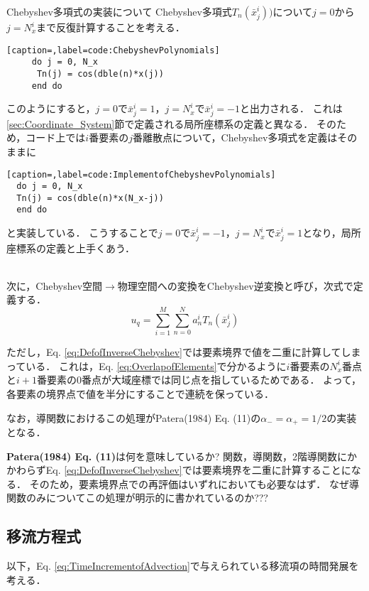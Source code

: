 \documentclass[12pt,a4paper]{jsarticle}
\begin{document}
\begin{itembox}[l]{Chebyshev多項式の実装について}
  Chebyshev多項式$T_{n}(\bar{x}_{j}^i))$について$j=0$から$j=N_{x}^i$まで反復計算することを考える．
  \begin{lstlisting}[caption=,label=code:ChebyshevPolynomials]
     do j = 0, N_x
      Tn(j) = cos(dble(n)*x(j))
     end do
  \end{lstlisting}
  このようにすると，$j=0$で$\bar{x}_{j}^i=1$，$j=N_{x}^i$で$\bar{x}_{j}^i=-1$と出力される．
  これは\ref{sec:Coordinate_System}節で定義される局所座標系の定義と異なる．
  そのため，コード上では$i$番要素の$j$番離散点について，Chebyshev多項式を定義はそのままに
  \begin{lstlisting}[caption=,label=code:ImplementofChebyshevPolynomials]
  do j = 0, N_x
  Tn(j) = cos(dble(n)*x(N_x-j))
  end do
  \end{lstlisting}
  と実装している．
  こうすることで$j=0$で$\bar{x}_{j}^i=-1$，$j=N_{x}^i$で$\bar{x}_{j}^i=1$となり，局所座標系の定義と上手くあう．
\end{itembox}\\

次に，Chebyshev空間$\rightarrow$物理空間への変換をChebyshev逆変換と呼び，次式で定義する．
\begin{equation}
  u_{q} = \sum_{i=1}^{M} \sum_{n=0}^N a_{n}^{i} T_{n}(\bar{x}_{j}^i)
\label{eq:DefofInverseChebyshev}
\end{equation}

ただし，Eq. \ref{eq:DefofInverseChebyshev}では要素境界で値を二重に計算してしまっている．
これは，Eq. \ref{eq:OverlapofElements}で分かるように$i$番要素の$N_{x}^i$番点と$i+1$番要素の$0$番点が大域座標では同じ点を指しているためである．
よって，各要素の境界点で値を半分にすることで連続を保っている．

なお，導関数におけるこの処理がPatera(1984) Eq. (11)の$\alpha_{-}=\alpha_{+}=1/2$の実装となる．\\

\begin{itembox}[l]{\textbf{Patera(1984) Eq. (11)}は何を意味しているか?}
  関数，導関数，2階導関数にかかわらずEq. \ref{eq:DefofInverseChebyshev}では要素境界を二重に計算することになる．
  そのため，要素境界点での再評価はいずれにおいても必要なはず．
  なぜ導関数のみについてこの処理が明示的に書かれているのか???
\end{itembox}


\subsection{移流方程式}
\label{sec:Advection_Equation}
以下，Eq. \ref{eq:TimeIncrementofAdvection}で与えられている移流項の時間発展を考える．
\end{document}
